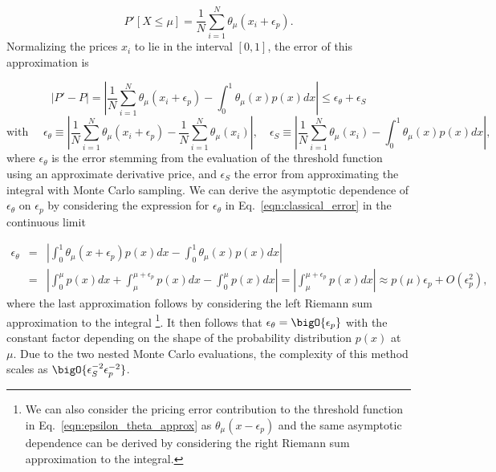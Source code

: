 \begin{enumerate}
\begin{equation}
	P'[X \le \mu] = \frac{1}{N}\sum_{i=1}^N \theta_{\mu}(x_i+\epsilon_p).
\end{equation}
Normalizing the prices $x_i$ to lie in the interval $[0,1]$, the error of this approximation is

\begin{equation}
	|P' - P| = \left| \frac{1}{N}\sum_{i=1}^N \theta_{\mu}(x_i+\epsilon_p) - \int_0^1 \theta_{\mu}(x)p(x)dx\right| \le \epsilon_{\theta} + \epsilon_S \nonumber
\end{equation}
\begin{equation}
	\label{eqn:classical_error}
	\textrm{with }\quad \epsilon_{\theta} \equiv \left| \frac{1}{N}\sum_{i=1}^N \theta_{\mu}(x_i+\epsilon_p) - \frac{1}{N}\sum_{i=1}^N \theta_{\mu}(x_i)\right|, \quad \epsilon_S \equiv \left| \frac{1}{N}\sum_{i=1}^N \theta_{\mu}(x_i) - \int_0^1 \theta_{\mu}(x)p(x)dx\right|,
\end{equation}
where $\epsilon_{\theta}$ is the error stemming from the evaluation of the threshold function using an approximate derivative price, and $\epsilon_{S}$ the error from approximating the integral with Monte Carlo sampling.
We can derive the asymptotic dependence of $\epsilon_{\theta}$ on $\epsilon_p$ by considering the expression for $\epsilon_{\theta}$ in Eq.~\eqref{eqn:classical_error} in the continuous limit

\begin{eqnarray}
	\label{eqn:epsilon_theta_approx}
	\epsilon_{\theta} &=& \left| \int_0^1 \theta_{\mu}(x+\epsilon_p)p(x)dx - \int_0^1 \theta_{\mu}(x)p(x)dx\right| \nonumber\\
	&=& \left|\int_0^{\mu} p(x)dx + \int_{\mu}^{\mu+\epsilon_p} p(x)dx - \int_0^{\mu} p(x)dx \right| = \left|\int_{\mu}^{\mu+\epsilon_p} p(x)dx \right| \approx p(\mu)\epsilon_p + O(\epsilon_p^2),
\end{eqnarray}
where the last approximation follows by considering the left Riemann sum approximation to the integral \footnote{We can also consider the pricing error contribution to the threshold function in Eq.~\eqref{eqn:epsilon_theta_approx} as $\theta_{\mu}(x-\epsilon_p)$ and the same asymptotic dependence can be derived by considering the right Riemann sum approximation to the integral.}.
It then follows that $\epsilon_{\theta} = \bigO{\epsilon_p}$ with the constant factor depending on the shape of the probability distribution $p(x)$ at $\mu$.
Due to the two nested Monte Carlo evaluations, the complexity of this method scales as $\bigO{\epsilon_S^{-2}\epsilon_p^{-2}}$.



\end{enumerate}
